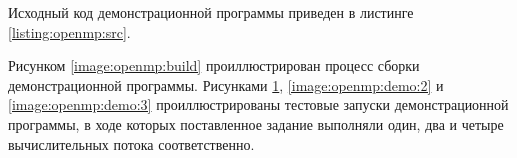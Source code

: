 Исходный код демонстрационной программы приведен в листинге \ref{listing:openmp:src}.

Рисунком \ref{image:openmp:build} проиллюстрирован процесс сборки демонстрационной программы. Рисунками \ref{image:openmp:demo:1}, \ref{image:openmp:demo:2} и \ref{image:openmp:demo:3} проиллюстрированы тестовые запуски демонстрационной программы, в ходе которых поставленное задание выполняли один, два и четыре вычислительных потока соответственно.



\begin{landscape}

	\begin{figure}

		\label{image:openmp:demo:1}


	\end{figure}

\end{landscape}

